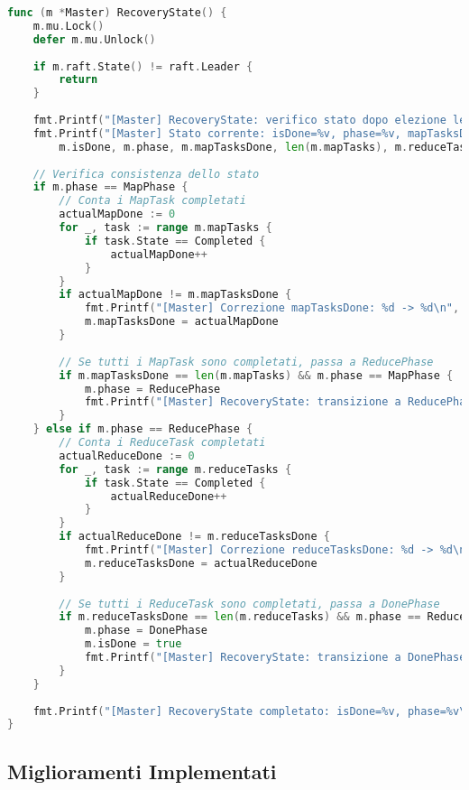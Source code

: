 \documentclass[12pt,a4paper]{article}
\begin{document}
\begin{lstlisting}[language=go]
func (m *Master) RecoveryState() {
    m.mu.Lock()
    defer m.mu.Unlock()
    
    if m.raft.State() != raft.Leader {
        return
    }
    
    fmt.Printf("[Master] RecoveryState: verifico stato dopo elezione leader\n")
    fmt.Printf("[Master] Stato corrente: isDone=%v, phase=%v, mapTasksDone=%d/%d, reduceTasksDone=%d/%d\n",
        m.isDone, m.phase, m.mapTasksDone, len(m.mapTasks), m.reduceTasksDone, len(m.reduceTasks))
    
    // Verifica consistenza dello stato
    if m.phase == MapPhase {
        // Conta i MapTask completati
        actualMapDone := 0
        for _, task := range m.mapTasks {
            if task.State == Completed {
                actualMapDone++
            }
        }
        if actualMapDone != m.mapTasksDone {
            fmt.Printf("[Master] Correzione mapTasksDone: %d -> %d\n", m.mapTasksDone, actualMapDone)
            m.mapTasksDone = actualMapDone
        }
        
        // Se tutti i MapTask sono completati, passa a ReducePhase
        if m.mapTasksDone == len(m.mapTasks) && m.phase == MapPhase {
            m.phase = ReducePhase
            fmt.Printf("[Master] RecoveryState: transizione a ReducePhase\n")
        }
    } else if m.phase == ReducePhase {
        // Conta i ReduceTask completati
        actualReduceDone := 0
        for _, task := range m.reduceTasks {
            if task.State == Completed {
                actualReduceDone++
            }
        }
        if actualReduceDone != m.reduceTasksDone {
            fmt.Printf("[Master] Correzione reduceTasksDone: %d -> %d\n", m.reduceTasksDone, actualReduceDone)
            m.reduceTasksDone = actualReduceDone
        }
        
        // Se tutti i ReduceTask sono completati, passa a DonePhase
        if m.reduceTasksDone == len(m.reduceTasks) && m.phase == ReducePhase {
            m.phase = DonePhase
            m.isDone = true
            fmt.Printf("[Master] RecoveryState: transizione a DonePhase\n")
        }
    }
    
    fmt.Printf("[Master] RecoveryState completato: isDone=%v, phase=%v\n", m.isDone, m.phase)
}
\end{lstlisting}

\subsection{Miglioramenti Implementati}
\end{document}
